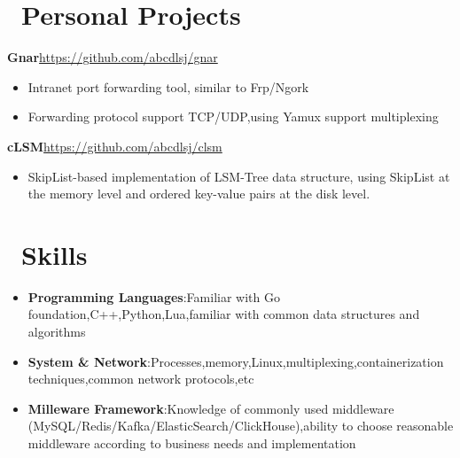 \documentclass{resume}
\newcommand{\en}[1]{#1}
\newcommand{\zh}[1]{}
\begin{document}
\section{\faGithubAlt\ \en{Personal Projects}\zh{Personal}}
{\textbf{\en{Gnar}\zh{Gnar}}}\hfill{\url{https://github.com/abcdlsj/gnar}}
\begin{itemize}[parsep=0.6ex]
      \item \en{Intranet port forwarding tool, similar to Frp/Ngork}
            \zh{内网端口转发工具,类似于 Frp/Ngork}
      \item \en{Forwarding protocol support TCP/UDP,using Yamux support multiplexing}
            \zh{转发协议支持 TCP/UDP,使用 Yamux 支持多路复用}
\end{itemize}

{\textbf{\en{cLSM}\zh{cLSM}}}\hfill{\url{https://github.com/abcdlsj/clsm}}
\begin{itemize}[parsep=0.6ex]
      \item \en{SkipList-based implementation of LSM-Tree data structure, using SkipList at the memory level and ordered key-value pairs at the disk level.}
            \zh{基于 SkipList 的 LSM-Tree 数据结构实现,内存层使用 SkipList,磁盘层使用有序键值对}
\end{itemize}

\section{\faCogs\ \en{Skills}\zh{技能}}
\begin{itemize}[parsep=0.6ex]
      \item \en{\textbf{Programming Languages}:Familiar with Go foundation,C++,Python,Lua,familiar with common data structures and algorithms}
            \zh{\textbf{编程语言}:熟悉 Go,了解 C++、Python、Lua,熟悉常用数据结构与算法}
      \item \en{\textbf{System \& Network}:Processes,memory,Linux,multiplexing,containerization techniques,common network protocols,etc}
            \zh{\textbf{系统 \& 网络}:进程、内存、Linux、多路复用、容器化技术、常见网络协议等}
      \item \en{\textbf{Milleware Framework}:Knowledge of commonly used middleware (MySQL/Redis/Kafka/ElasticSearch/ClickHouse),ability to choose reasonable middleware according to business needs and implementation}
            \zh{\textbf{中间件}:了解常用中间件及组件(MySQL/Redis/Kafka/ElasticSearch/ClickHouse),能根据业务需求选择合理的中间件并接入}
\end{itemize}
\end{document}

